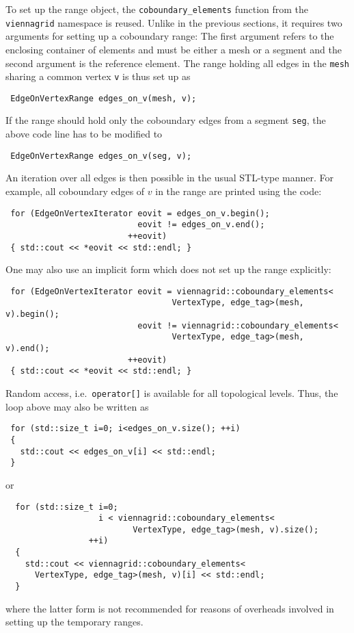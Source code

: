 To set up the range object, the \lstinline|coboundary_elements| function from the \lstinline|viennagrid| namespace is reused. Unlike in the previous sections, it requires two arguments
for setting up a coboundary range: The first argument refers to the enclosing container of elements and must be either a mesh or a segment and the second argument is the reference element.
The range holding all edges in the \lstinline|mesh| sharing a common vertex \lstinline|v| is thus set up as
\begin{lstlisting}
 EdgeOnVertexRange edges_on_v(mesh, v);
\end{lstlisting}

If the range should hold only the coboundary edges from a segment \lstinline|seg|, the above code line has to be modified to
\begin{lstlisting}
 EdgeOnVertexRange edges_on_v(seg, v);
\end{lstlisting}

An iteration over all edges is then possible in the usual STL-type manner. For example, all coboundary edges of $v$ in the range are printed using the code:
\begin{lstlisting}
 for (EdgeOnVertexIterator eovit = edges_on_v.begin();
                           eovit != edges_on_v.end();
                         ++eovit)
 { std::cout << *eovit << std::endl; }
\end{lstlisting}
One may also use an implicit form which does not set up the range explicitly:
\begin{lstlisting}
 for (EdgeOnVertexIterator eovit = viennagrid::coboundary_elements<
                                  VertexType, edge_tag>(mesh, v).begin();
                           eovit != viennagrid::coboundary_elements<
                                  VertexType, edge_tag>(mesh, v).end();
                         ++eovit)
 { std::cout << *eovit << std::endl; }
\end{lstlisting}

Random access, i.e.~\lstinline|operator[]| is available for all topological levels. Thus, the loop above may also be written as
\begin{lstlisting}
 for (std::size_t i=0; i<edges_on_v.size(); ++i)
 {
   std::cout << edges_on_v[i] << std::endl;
 }
\end{lstlisting}
or
\begin{lstlisting}
  for (std::size_t i=0;
                   i < viennagrid::coboundary_elements<
                          VertexType, edge_tag>(mesh, v).size();
                 ++i)
  {
    std::cout << viennagrid::coboundary_elements<
      VertexType, edge_tag>(mesh, v)[i] << std::endl;
  }
\end{lstlisting}
where the latter form is not recommended for reasons of overheads involved in setting up the temporary ranges.

